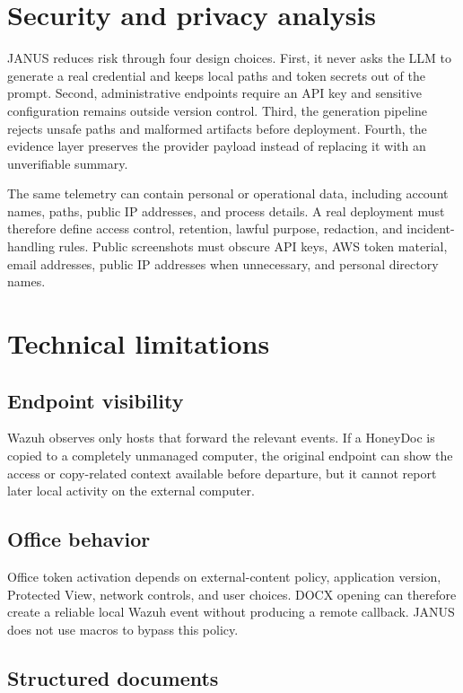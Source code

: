 \section{Security and privacy analysis}

JANUS reduces risk through four design choices. First, it never asks the LLM to
generate a real credential and keeps local paths and token secrets out of the
prompt. Second, administrative endpoints require an API key and sensitive
configuration remains outside version control. Third, the generation pipeline
rejects unsafe paths and malformed artifacts before deployment. Fourth, the
evidence layer preserves the provider payload instead of replacing it with an
unverifiable summary.

The same telemetry can contain personal or operational data, including account
names, paths, public IP addresses, and process details. A real deployment must
therefore define access control, retention, lawful purpose, redaction, and
incident-handling rules. Public screenshots must obscure API keys, AWS token
material, email addresses, public IP addresses when unnecessary, and personal
directory names.

\section{Technical limitations}

\subsection{Endpoint visibility}

Wazuh observes only hosts that forward the relevant events. If a HoneyDoc is
copied to a completely unmanaged computer, the original endpoint can show the
access or copy-related context available before departure, but it cannot report
later local activity on the external computer.

\subsection{Office behavior}

Office token activation depends on external-content policy, application
version, Protected View, network controls, and user choices. DOCX opening can
therefore create a reliable local Wazuh event without producing a remote
callback. JANUS does not use macros to bypass this policy.

\subsection{Structured documents}

